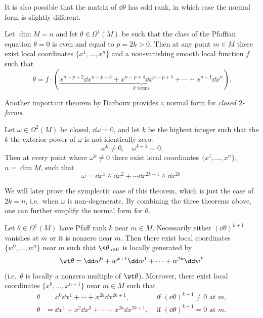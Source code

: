It is also possible that the matrix of $\dd\theta$ has odd rank, in which case the normal form is slightly different.

\begin{thm}
    Let $\dim M=n$ and let $\theta\in\Omega^1(M)$ be such that the class of the Pfaffian equation $\theta=0$ is even and equal to $p=2k>0$. Then at any point $m\in M$ there exist local coordinates $\{x^1,\ldots,x^n\}$ and a non-vanishing smooth local function $f$ such that 
    \[\theta=f\cdot (\underbrace{x^{n-p+2}\dd x^{n-p+3}+x^{n-p+4}\dd x^{n-p+5}+\cdots +x^{n-1}\dd x^n}_{k\text{ terms}}).\]
\end{thm}

Another important theorem by Darboux provides a normal form for \emph{closed $2$-forms}.

\begin{thm}[Darboux]
    Let $\omega\in\Omega^2(M)$ be closed, $\dd\omega=0$, and let $k$ be the highest integer such that the $k$-the exterior power of $\omega$ is not identically zero:
    \[\omega^k\neq 0,\quad \omega^{k+1}=0.\]
    Then at every point where $\omega^k\neq 0$ there exist local coordinates $\{x^1,\ldots,x^n\}$, $n=\dim M$, such that 
    \[\omega=\dd x^1\wedge \dd x^2+\cdots \dd x^{2k-1}\wedge\dd x^{2k}.\]
\end{thm}

We will later prove the symplectic case of this theorem, which is just the case of $2k=n$, i.e.\ when $\omega$ is non-degenerate. By combining the three theorems above, one can further simplify the normal form for $\theta$.

\begin{thm}[Darboux]
    Let $\theta\in\Omega^1(M)$ have Pfaff rank $k$ near $m\in M$. Necessarily either $(\dd\theta)^{k+1}$ vanishes at $m$ or it is nonzero near $m$. Then there exist local coordinates $\{w^0,\ldots,w^n\}$ near $m$ such that $\<\theta\>_{\mathrm{diff}}$ is locally generated by 
    \[\wt\theta=\dd w^0+w^{k+1}\dd w^1+\cdots +w^{2k}\dd w^k\]
    (i.e.\ $\theta$ is locally a nonzero multiple of $\wt\theta$). Moreover, there exist local coordinates $\{x^0,\ldots,x^{n-1}\}$ near $m\in M$ such that
    \begin{align}
        \theta&= x^0 \dd x^1+\cdots +x^{2k}\dd x^{2k+1}, &\text{ if }(\dd\theta)^{k+1}\neq 0\text{ at }m,\\
        \theta&= \dd x^1+ x^2\dd x^3+\cdots +x^{2k} \dd x^{2k+1}, &\text{ if }(\dd\theta)^{k+1}=0 \text{ at }m.
    \end{align}
\end{thm}

